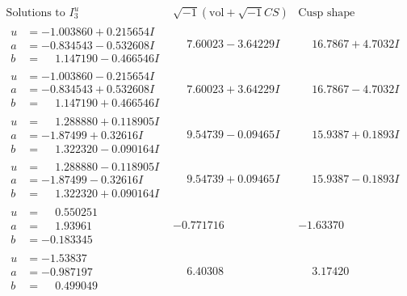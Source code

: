 \documentclass[1p]{elsarticle_modified}
\theoremstyle{definition}
\newcommand{\I}{\sqrt{-1}}
\begin{document}
$$\begin{array}{c|c|c}  
\text{Solutions to }I^u_{3}& \I (\text{vol} + \sqrt{-1}CS) & \text{Cusp shape}\\
 \hline 
\begin{aligned}
u &= -1.003860 + 0.215654 I \\
a &= -0.834543 - 0.532608 I \\
b &= \phantom{-}1.147190 - 0.466546 I\end{aligned}
 & \phantom{-}7.60023 - 3.64229 I & \phantom{-}16.7867 + 4.7032 I \\ \hline\begin{aligned}
u &= -1.003860 - 0.215654 I \\
a &= -0.834543 + 0.532608 I \\
b &= \phantom{-}1.147190 + 0.466546 I\end{aligned}
 & \phantom{-}7.60023 + 3.64229 I & \phantom{-}16.7867 - 4.7032 I \\ \hline\begin{aligned}
u &= \phantom{-}1.288880 + 0.118905 I \\
a &= -1.87499 + 0.32616 I \\
b &= \phantom{-}1.322320 - 0.090164 I\end{aligned}
 & \phantom{-}9.54739 - 0.09465 I & \phantom{-}15.9387 + 0.1893 I \\ \hline\begin{aligned}
u &= \phantom{-}1.288880 - 0.118905 I \\
a &= -1.87499 - 0.32616 I \\
b &= \phantom{-}1.322320 + 0.090164 I\end{aligned}
 & \phantom{-}9.54739 + 0.09465 I & \phantom{-}15.9387 - 0.1893 I \\ \hline\begin{aligned}
u &= \phantom{-}0.550251\phantom{ +0.000000I} \\
a &= \phantom{-}1.93961\phantom{ +0.000000I} \\
b &= -0.183345\phantom{ +0.000000I}\end{aligned}
 & -0.771716\phantom{ +0.000000I} & -1.63370\phantom{ +0.000000I} \\ \hline\begin{aligned}
u &= -1.53837\phantom{ +0.000000I} \\
a &= -0.987197\phantom{ +0.000000I} \\
b &= \phantom{-}0.499049\phantom{ +0.000000I}\end{aligned}
 & \phantom{-}6.40308\phantom{ +0.000000I} & \phantom{-}3.17420\phantom{ +0.000000I} \\ \hline\begin{aligned}

\end{aligned}
\end{array}$$
\end{document}
